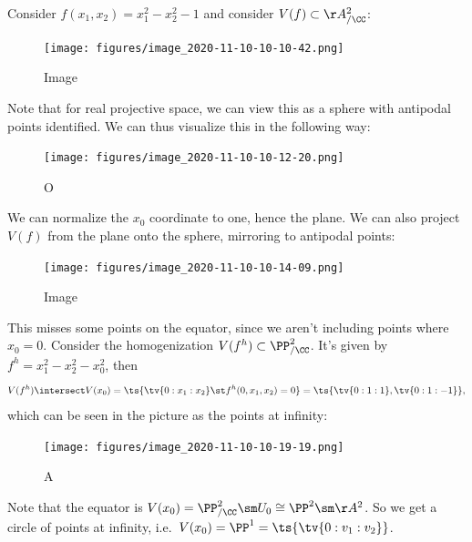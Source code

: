 \begin{example}[?]

Consider \(f(x_1, x_2) = x_1^2 - x_2^2 - 1\) and consider
\(V(f) \subset \AA^2_{/\CC}\):

\begin{figure}
\centering
\texttt{[image: figures/image\_2020-11-10-10-10-42.png]}
\caption{Image}
\end{figure}

Note that for real projective space, we can view this as a sphere with
antipodal points identified. We can thus visualize this in the following
way:

\begin{figure}
\centering
\texttt{[image: figures/image\_2020-11-10-10-12-20.png]}
\caption{O}
\end{figure}

We can normalize the \(x_0\) coordinate to one, hence the plane. We can
also project \(V(f)\) from the plane onto the sphere, mirroring to
antipodal points:

\begin{figure}
\centering
\texttt{[image: figures/image\_2020-11-10-10-14-09.png]}
\caption{Image}
\end{figure}

This misses some points on the equator, since we aren't including points
where \(x_0 = 0\). Consider the homogenization
\(V(f^h) \subset \PP^2_{/\CC}\). It's given by
\(f^h = x_1^2 - x_2^2 - x_0^2\), then
\begin{align*}  
V(f^h) \intersect V(x_0) = \ts{\tv{0:x_1:x_2} \st f^h(0, x_1, x_2) = 0 } = \ts{\tv{0:1:1}, \tv{0:1:-1}}
,\end{align*} which can be seen in the picture as the points at
infinity:

\begin{figure}
\centering
\texttt{[image: figures/image\_2020-11-10-10-19-19.png]}
\caption{A}
\end{figure}

Note that the equator is
\(V(x_0) = \PP^2_{/\CC}\sm U_0 \cong \PP^2\sm \AA^2\). So we get a
circle of points at infinity,
i.e.~\(V(x_0) = \PP^1 = \ts{\tv{0:v_1:v_2}}\).

\end{example}

